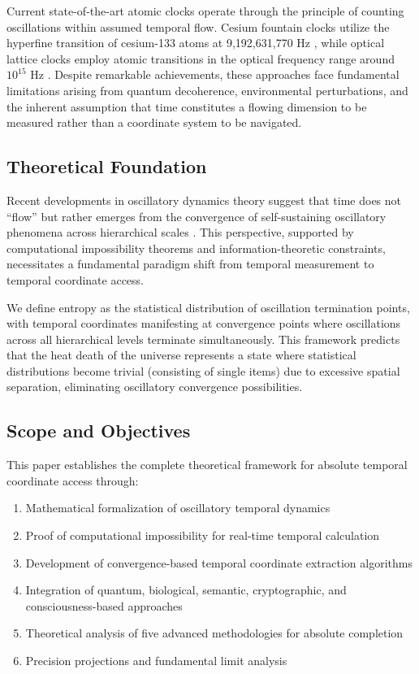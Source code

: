 \documentclass[11pt]{article}
\theoremstyle{remark}
\begin{document}
Current state-of-the-art atomic clocks operate through the principle of counting oscillations within assumed temporal flow. Cesium fountain clocks utilize the hyperfine transition of cesium-133 atoms at 9,192,631,770 Hz \cite{wynands2005atomic}, while optical lattice clocks employ atomic transitions in the optical frequency range around $10^{15}$ Hz \cite{nicholson2015systematic}. Despite remarkable achievements, these approaches face fundamental limitations arising from quantum decoherence, environmental perturbations, and the inherent assumption that time constitutes a flowing dimension to be measured rather than a coordinate system to be navigated.

\subsection{Theoretical Foundation}

Recent developments in oscillatory dynamics theory suggest that time does not ``flow'' but rather emerges from the convergence of self-sustaining oscillatory phenomena across hierarchical scales \cite{kuramoto1984chemical,strogatz2018nonlinear}. This perspective, supported by computational impossibility theorems and information-theoretic constraints, necessitates a fundamental paradigm shift from temporal measurement to temporal coordinate access.

We define entropy as the statistical distribution of oscillation termination points, with temporal coordinates manifesting at convergence points where oscillations across all hierarchical levels terminate simultaneously. This framework predicts that the heat death of the universe represents a state where statistical distributions become trivial (consisting of single items) due to excessive spatial separation, eliminating oscillatory convergence possibilities.

\subsection{Scope and Objectives}

This paper establishes the complete theoretical framework for absolute temporal coordinate access through:

\begin{enumerate}
\item Mathematical formalization of oscillatory temporal dynamics
\item Proof of computational impossibility for real-time temporal calculation
\item Development of convergence-based temporal coordinate extraction algorithms
\item Integration of quantum, biological, semantic, cryptographic, and consciousness-based approaches
\item Theoretical analysis of five advanced methodologies for absolute completion
\item Precision projections and fundamental limit analysis
\end{enumerate}
\end{document}
